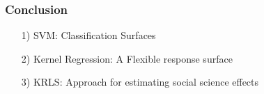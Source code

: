 \documentclass{beamer}
\numberwithin{equation}{section}
\begin{document}
\begin{frame}
\frametitle{Conclusion}

\begin{itemize}
\item[1)] SVM: Classification Surfaces
\item[2)] Kernel Regression: A Flexible response surface
\item[3)] KRLS: Approach for estimating social science effects
\end{itemize}




\end{frame}
\end{document}
